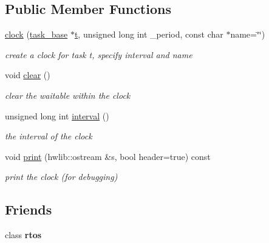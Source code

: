 \subsection*{Public Member Functions}
\begin{DoxyCompactItemize}
\item 
\hyperlink{classrtos_1_1clock_a90279f3e878dbe768e2d98e8ab77be11}{clock} (\hyperlink{classrtos_1_1task__base}{task\+\_\+base} $\ast$\hyperlink{classrtos_1_1event_aa83745aabc941145f00386fd63f6b557}{t}, unsigned long int \+\_\+period, const char $\ast$name=\char`\"{}\char`\"{})
\begin{DoxyCompactList}\small\item\em create a clock for task t, specify interval and name \end{DoxyCompactList}\item 
void \hyperlink{classrtos_1_1clock_af6e9d0a1101ddf5457585aab6b104c31}{clear} ()
\begin{DoxyCompactList}\small\item\em clear the waitable within the clock \end{DoxyCompactList}\item 
unsigned long int \hyperlink{classrtos_1_1clock_a7535de425382162813ab5eb7e66cd18b}{interval} ()\hypertarget{classrtos_1_1clock_a7535de425382162813ab5eb7e66cd18b}{}\label{classrtos_1_1clock_a7535de425382162813ab5eb7e66cd18b}

\begin{DoxyCompactList}\small\item\em the interval of the clock \end{DoxyCompactList}\item 
void \hyperlink{classrtos_1_1clock_a2b61cfa27fc686915fa51fc6d7444231}{print} (hwlib\+::ostream \&s, bool header=true) const \hypertarget{classrtos_1_1clock_a2b61cfa27fc686915fa51fc6d7444231}{}\label{classrtos_1_1clock_a2b61cfa27fc686915fa51fc6d7444231}

\begin{DoxyCompactList}\small\item\em print the clock (for debugging) \end{DoxyCompactList}\end{DoxyCompactItemize}
\subsection*{Friends}
\begin{DoxyCompactItemize}
\item 
class {\bfseries rtos}\hypertarget{classrtos_1_1clock_a2a7bcfc34141352757ad672e3ecd099f}{}\label{classrtos_1_1clock_a2a7bcfc34141352757ad672e3ecd099f}

\end{DoxyCompactItemize}

